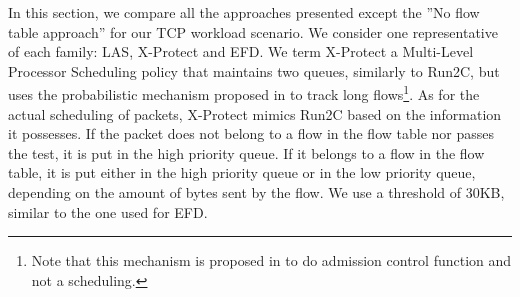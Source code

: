 \documentclass[preprint,12pt]{elsarticle}
\begin{document}
In this section, we compare all the approaches presented except the ''No flow table approach'' for our TCP workload scenario. We consider one representative of each family: LAS, X-Protect and EFD. We term X-Protect a Multi-Level Processor Scheduling policy that maintains two queues, similarly to Run2C, but uses the probabilistic mechanism proposed in \cite{Kortebi04Xprotect} to track long flows\footnote{Note that this mechanism is proposed in \cite{Kortebi04Xprotect} to do admission control function and not a scheduling.}. As for the actual scheduling of packets, X-Protect mimics Run2C based on the information it possesses. If the packet does not belong to a flow in the flow table nor passes the test, it is put in the high priority queue. If it belongs to a flow in the flow table, it is put either in the high priority queue or in the low priority queue, depending on the amount of bytes sent by the flow. We use a threshold of 30KB, similar to the one used for EFD.


\end{document}

